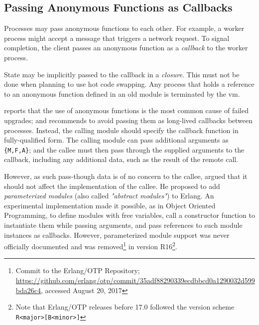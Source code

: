 \subsection{Passing Anonymous Functions as Callbacks}

Processes may pass anonymous functions to each other. For example, a worker process might accept a message that triggers a network request. To signal completion, the client passes an anonymous function as a \emph{callback} to the worker process.

State may be implicitly passed to the callback in a \emph{closure}. This must not be done when planning to use hot code swapping. Any process that holds a reference to an anonymous function defined in an old module is terminated by the \acrshort{vm}.

\cite{davis:talk} reports that the use of anonymous functions is the most common cause of failed upgrades; and recommends to avoid passing them as long-lived callbacks between processes. Instead, the calling module should specify the callback function in fully-qualified form. The calling module can pass additional arguments as \lstinline|{M,F,A}|; and the callee must then pass through the supplied arguments to the callback, including any additional data, such as the result of the remote call.

However, as such pass-though data is of no concern to the callee, \cite{carlsson:parameterized} argued that it should not affect the implementation of the callee. He proposed to add \emph{parameterized modules} (also called \emph{"abstract modules"}) to Erlang. An experimental implementation made it possible, as in Object Oriented Programming, to define modules with free variables, call a constructor function to instantiate them while passing arguments, and pass references to such module instances as callbacks.
However, parameterized module support was never officially documented and was removed\footnote{Commit to the Erlang/OTP Repository; \url{https://github.com/erlang/otp/commit/35adf88290339ecdbbcd0a1290032d599bda26c4}, accessed August 20, 2017} in version R16\footnote{Note that Erlang/OTP releases before 17.0 followed the version scheme \lstinline|R<major>[B<minor>]|}.
